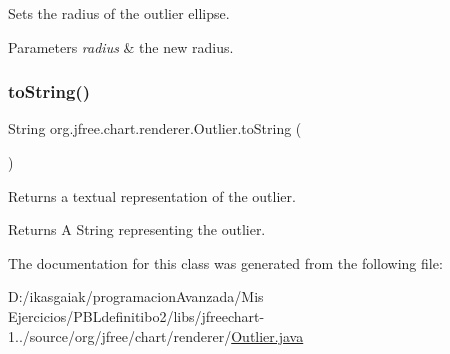 Sets the radius of the outlier ellipse.


\begin{DoxyParams}{Parameters}
{\em radius} & the new radius. \\
\hline
\end{DoxyParams}
\mbox{\label{classorg_1_1jfree_1_1chart_1_1renderer_1_1_outlier_a3ad7d121f5de2766eebb032c14a7759a}} 
\subsubsection{\texorpdfstring{to\+String()}{toString()}}
{\footnotesize\ttfamily String org.\+jfree.\+chart.\+renderer.\+Outlier.\+to\+String (\begin{DoxyParamCaption}{ }\end{DoxyParamCaption})}

Returns a textual representation of the outlier.

\begin{DoxyReturn}{Returns}
A {\ttfamily String} representing the outlier. 
\end{DoxyReturn}


The documentation for this class was generated from the following file\+:\begin{DoxyCompactItemize}
\item 
D\+:/ikasgaiak/programacion\+Avanzada/\+Mis Ejercicios/\+P\+B\+Ldefinitibo2/libs/jfreechart-\/1../source/org/jfree/chart/renderer/\mbox{\hyperlink{_outlier_8java}{Outlier.\+java}}\end{DoxyCompactItemize}
